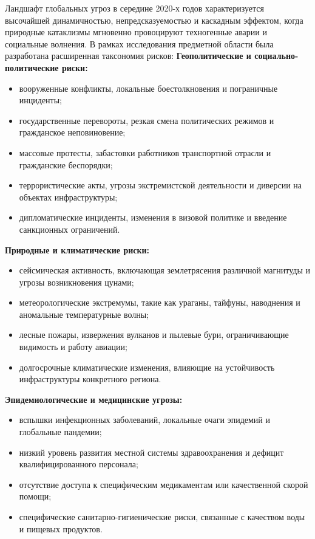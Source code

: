 Ландшафт глобальных угроз в середине 2020-х годов характеризуется высочайшей динамичностью, непредсказуемостью и каскадным эффектом, когда природные катаклизмы мгновенно провоцируют техногенные аварии и социальные волнения. В рамках исследования предметной области была разработана расширенная таксономия рисков:
\textbf{Геополитические и социально-политические риски:}
    \begin{itemize}
    \item вооруженные конфликты, локальные боестолкновения и пограничные инциденты;
    \item государственные перевороты, резкая смена политических режимов и гражданское неповиновение;
    \item массовые протесты, забастовки работников транспортной отрасли и гражданские беспорядки;
    \item террористические акты, угрозы экстремистской деятельности и диверсии на объектах инфраструктуры;
    \item дипломатические инциденты, изменения в визовой политике и введение санкционных ограничений.
    \end{itemize}
\textbf{Природные и климатические риски:}
    \begin{itemize}
    \item сейсмическая активность, включающая землетрясения различной магнитуды и угрозы возникновения цунами;
    \item метеорологические экстремумы, такие как ураганы, тайфуны, наводнения и аномальные температурные волны;
    \item лесные пожары, извержения вулканов и пылевые бури, ограничивающие видимость и работу авиации;
    \item долгосрочные климатические изменения, влияющие на устойчивость инфраструктуры конкретного региона.
    \end{itemize}
\textbf{Эпидемиологические и медицинские угрозы:}
    \begin{itemize}
    \item вспышки инфекционных заболеваний, локальные очаги эпидемий и глобальные пандемии;
    \item низкий уровень развития местной системы здравоохранения и дефицит квалифицированного персонала;
    \item отсутствие доступа к специфическим медикаментам или качественной скорой помощи;
    \item специфические санитарно-гигиенические риски, связанные с качеством воды и пищевых продуктов.
    \end{itemize}
